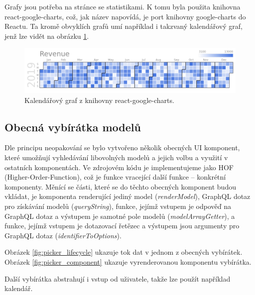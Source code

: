 \noindent
Grafy jsou potřeba na stránce se statistikami. K tomu byla použita knihovna react-google-charts,
což, jak název napovídá, je port knihovny google-charts do Reactu. Ta kromě obvyklích grafů umí
například i takzvaný kalendářový graf, jenž lze vidět na obrázku \ref{fig:google_charts}.

\begin{figure}[!htb] \centering
  \includegraphics[width=145mm]{../img/google_charts.png}
  \caption{Kalendářový graf z knihovny react-google-charts.}
  \label{fig:google_charts}
\end{figure}

\subsection{Obecná vybírátka modelů}

\noindent
Dle principu neopakování se bylo vytvořeno několik obecných UI komponent, které umožňují vyhledávání libovolných
modelů a jejich volbu a využití v ostatních komponentách. Ve zdrojovém kódu je implementujeme jako
HOF (Higher-Order-Function), což je funkce vracející další funkce -- konkrétní komponenty.
Měnící se části, které se do těchto obecných komponent budou vkládat, je komponenta renderující jediný model
(\textit{renderModel}),
GraphQL dotaz pro získávání modelů (\textit{queryString}), funkce, jejímž vstupem je odpověď na GraphQL dotaz a výstupem je
samotné pole modelů (\textit{modelArrayGetter}), a funkce, jejímž vstupem je dotazovací řetězec a výstupem jsou
argumenty pro GraphQL dotaz (\textit{identifierToOptions}).

Obrázek \ref{fig:picker_lifecycle} ukazuje tok dat v jednom z obecných vybírátek.
Obrázek \ref{fig:picker_component} ukazuje vyrenderovanou komponentu vybírátka.

Další vybírátka abstrahují i vstup od uživatele, takže lze použít například kalendář.

